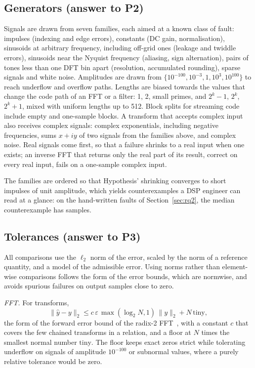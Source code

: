 \documentclass[10pt,conference]{IEEEtran}
\newcommand{\eps}{\varepsilon}
\begin{document}
\subsection{Generators (answer to P2)}
\label{sec:generators}
Signals are drawn from seven families, each aimed at a known class of fault:
impulses (indexing and edge errors), constants (DC gain, normalisation),
sinusoids at arbitrary frequency, including off-grid ones (leakage and twiddle
errors), sinusoids near the Nyquist frequency (aliasing, sign alternation),
pairs of tones less than one DFT bin apart (resolution, accumulated rounding),
sparse signals and white noise. Amplitudes are drawn from
$\{10^{-100},10^{-3},1,10^{3},10^{100}\}$ to reach underflow and overflow paths.
Lengths are biased towards the values that change the code path of an FFT or
a filter: 1, 2, small primes, and $2^k-1$, $2^k$, $2^k+1$, mixed with uniform
lengths up to 512. Block splits for streaming code include empty and
one-sample blocks. A transform that accepts complex input also receives complex
signals: complex exponentials, including negative frequencies, sums $x+iy$ of
two signals from the families above, and complex noise. Real signals come
first, so that a failure shrinks to a real input when one exists; an inverse
FFT that returns only the real part of its result, correct on every real
input, fails on a one-sample complex input.

The families are ordered so that Hypothesis' shrinking converges to short
impulses of unit amplitude, which yields counterexamples a DSP engineer can read
at a glance: on the hand-written faults of Section~\ref{sec:rq2}, the median
counterexample has \handMedianLen{} samples.

\subsection{Tolerances (answer to P3)}
\label{sec:tolerances}
All comparisons use the $\ell_2$ norm of the error, scaled by the norm of a
reference quantity, and a model of the admissible error. Using norms rather
than element-wise comparisons follows the form of the error bounds, which are
normwise, and avoids spurious failures on output samples close to zero.

\emph{FFT.} For transforms,
\begin{equation}
\|\hat y-y\|_2 \le c\,\eps\,\max(\log_2N,1)\,\|y\|_2 + N\,\mathrm{tiny},
\label{eq:fft}
\end{equation}
the form of the forward error bound of the radix-2
FFT~\cite[Thm.~24.2]{higham2002accuracy}, with a constant $c$ that covers the
few chained transforms in a relation, and a floor at $N$ times the smallest
normal number $\mathrm{tiny}$. The floor keeps exact zeros strict while
tolerating underflow on signals of amplitude $10^{-100}$ or subnormal values,
where a purely relative tolerance would be zero.
\end{document}
